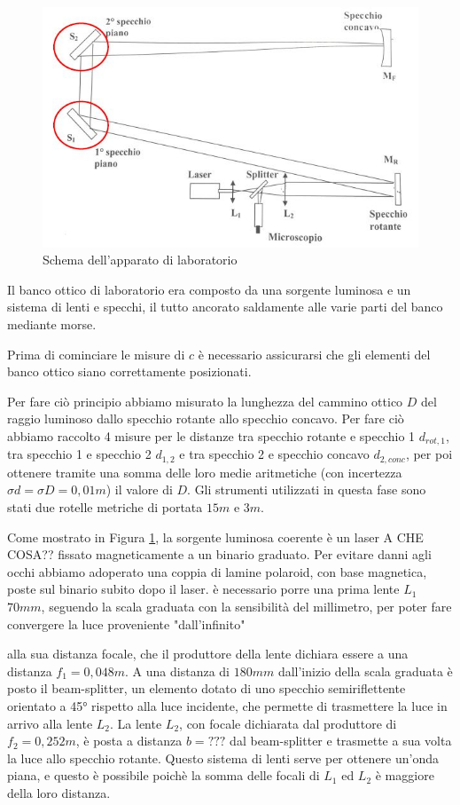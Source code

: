 \documentclass{article}
\begin{document}
\begin{figure}[h] %
    \centering
    \includegraphics[width=0.6\linewidth]{Progettazione1.JPG}
    \caption{Schema dell'apparato di laboratorio}
    \label{schema_apparato}
\end{figure}

Il banco ottico di laboratorio era composto da una sorgente luminosa e un sistema di lenti e specchi, il tutto ancorato saldamente alle varie parti del banco mediante 
morse.

Prima di cominciare le misure di $c$ è necessario assicurarsi che gli elementi del banco ottico siano correttamente posizionati.

\vspace{3mm}

Per fare ciò principio abbiamo misurato la lunghezza del cammino ottico $D$ del raggio luminoso dallo specchio rotante allo specchio concavo. Per fare ciò abbiamo raccolto 
4 misure per le distanze tra specchio rotante e specchio 1 $d_{rot,1}$, tra specchio 1 e specchio 2 $d_{1,2}$ e tra specchio 2 e specchio concavo $d_{2,conc}$, per poi 
ottenere tramite una somma delle loro medie aritmetiche (con incertezza $\sigma d = \sigma D = 0,01 m$) il valore di $D$. Gli strumenti utilizzati in questa fase sono
stati due rotelle metriche di portata $15m$ e $3m$.

Come mostrato in Figura \ref{schema_apparato}, la sorgente luminosa coerente è un laser A CHE COSA?? fissato magneticamente a un binario graduato. Per evitare danni agli
occhi abbiamo adoperato una coppia di lamine polaroid, con base magnetica, poste sul binario subito dopo il laser.
è necessario porre una prima lente $L_1$ $70 mm$, seguendo la scala graduata con la sensibilità del millimetro, per poter fare convergere la luce proveniente "dall'infinito"
 alla sua distanza focale, che il produttore 
della lente dichiara essere a una distanza $f_1 = 0,048 m$. A una distanza di $180mm$ dall'inizio della scala graduata è posto il beam-splitter, un elemento dotato di uno
specchio semiriflettente orientato a 45° rispetto alla luce incidente, che permette di trasmettere la luce in arrivo alla lente $L_2$. La lente $L_2$, con 
focale dichiarata dal produttore di $f_2=0,252m$, è posta a distanza $b = ???$ dal beam-splitter e trasmette a sua volta la luce allo specchio rotante. 
Questo sistema di lenti serve per ottenere un'onda piana, e questo è possibile poichè la somma delle focali di $L_1$ ed $L_2$ è maggiore della loro distanza. 
\end{document}
